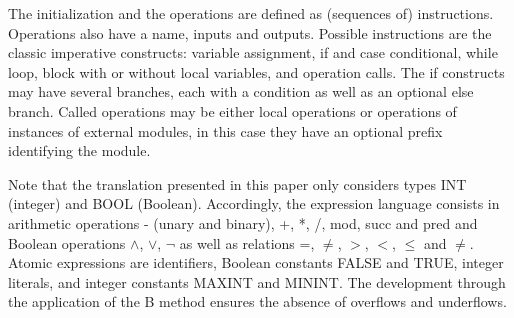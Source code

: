 \documentclass{llncs}
\newcommand{\B}[1]{\textsf{#1}}
\begin{document}
The initialization and the operations are defined as (sequences of)
instructions. Operations also have a name, inputs and outputs. Possible
instructions are the classic imperative constructs: variable assignment, if and
case conditional, while loop, block with or without local variables, and
operation calls. The if constructs may have several branches, each with a
condition as well as an optional else branch. Called operations may be either
local operations or operations of instances of external modules, in this case
they have an optional prefix identifying the module. 

Note that the translation presented in this paper only considers types \B{INT}
(integer) and \B{BOOL} (Boolean). Accordingly, the expression language consists
in arithmetic operations \B{-} (unary and binary), \B{+}, \B{*}, \B{/}, \B{mod},
\B{succ} and \B{pred} and Boolean operations
\B{$\land$}, \B{$\lor$}, \B{$\neg$} as well as relations \B{=}, \B{$\neq$},
\B{$>$}, \B{$<$}, \B{$\leq$} and \B{$\neq$}. Atomic expressions are identifiers,
Boolean constants \B{FALSE} and \B{TRUE}, integer literals, and integer
constants \B{MAXINT} and \B{MININT}. The development through the application of
the B method ensures the absence of overflows and underflows.
\end{document}
